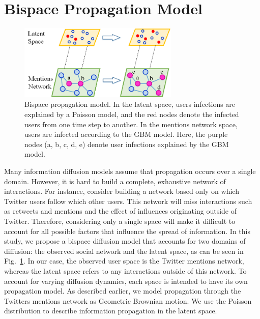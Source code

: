 \section{Bispace Propagation Model}

\begin{figure}[ht]
\centering
\includegraphics[width=3in] {figures/Bio-space.png}
\caption{Bispace propagation model. In the latent space, users infections are explained by a Poisson model, and the red nodes denote the infected users from one time step to another. In the mentions network space, users are infected according to the GBM model. Here, the purple nodes (a, b, c, d, e) denote user infections explained by the GBM model. }
\label{fig:bi-space}
\end{figure}


Many information diffusion models assume that propagation occurs over a single domain.
However, it is hard to build a complete, exhaustive network of interactions.
For instance, consider building a network based only on which Twitter users follow which other users. This network will miss interactions such as retweets and mentions and the effect of influences originating
outside of Twitter. Therefore, considering only a single space will make it difficult to account for all possible factors that influence the spread of information.
In this study, we propose a bispace diffusion model that accounts for two domains of diffusion: the observed social network and the latent space, as can be seen in Fig.~\ref{fig:bi-space}.
In our case, the observed user space is the Twitter mentions network,
whereas the latent space refers to any interactions outside of this network.
To account for varying diffusion dynamics, each space is intended to have
its own propagation model.
As described earlier, we model propagation through the Twitters mentions network as Geometric Brownian motion. We use the Poisson distribution to describe information propagation in the latent space.

